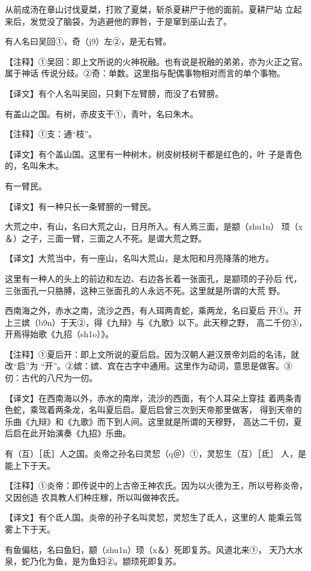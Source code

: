 \documentclass[a4paper,12pt,UTF8,twoside]{ctexbook}
\begin{document}
从前成汤在章山讨伐夏桀，打败了夏桀，斩杀夏耕尸于他的面前。夏耕尸站 立起来后，发觉没了脑袋，为逃避他的罪咎，于是窜到巫山去了。

有人名曰吴回①，奇（j9）左②，是无右臂。

【注释】①吴回：即上文所说的火神祝融。也有说是祝融的弟弟，亦为火正之官。属于神话 传说分歧。②奇：单数。这里指与配偶事物相对而言的单个事物。

【译文】有个人名叫吴回，只剩下左臂膀，而没了右臂膀。

有盖山之国。有树，赤皮支干①，青叶，名曰朱木。

【注释】①支：通“枝”。

【译文】有个盖山国。这里有一种树木，树皮树枝树干都是红色的，叶 子是青色的，名叫朱木。

有一臂民。

【译文】有一种只长一条臂膀的一臂民。

大荒之中，有山，名曰大荒之山，日月所入。有人焉三面，是颛（zhu1n） 顼（x＆）之子，三面一臂，三面之人不死。是谓大荒之野。

【译文】大荒当中，有一座山，名叫大荒山，是太阳和月亮降落的地方。

这里有一种人的头上的前边和左边、右边各长着一张面孔，是颛顼的子孙后 代，三张面孔一只胳膊，这种三张面孔的人永远不死。这里就是所谓的大荒 野。

西南海之外，赤水之南，流沙之西，有人珥两青蛇，乘两龙，名曰夏后 开①。开上三嫔（b9n）于天②，得《九辩》与《九歌》以下。此天穆之野， 高二千仞③，开焉得始歌《九招（sh1o）》。

【注释】①夏后开：即上文所说的夏后启。因为汉朝人避汉景帝刘启的名讳，就改“启”为 “开”。②嫔：嫔、宾在古字中通用。这里作为动词，意思是做客。③仞：古代的八尺为一仞。

【译文】在西南海以外，赤水的南岸，流沙的西面，有个人耳朵上穿挂 着两条青色蛇，乘驾着两条龙，名叫夏后启。夏后启曾三次到天帝那里做客， 得到天帝的乐曲《九辩》和《九歌》而下到人间。这里就是所谓的天穆野， 高达二千仞，夏后启在此开始演奏《九招》乐曲。

有（互）［氐］人之国。炎帝之孙名曰灵恝（q＠）①，灵恝生（互）［氐］ 人，是能上下于天。

【注释】①炎帝：即传说中的上古帝王神农氏。因为以火德为王，所以号称炎帝，又因创造 农具教人们种庄稼，所以叫做神农氏。

【译文】有个氐人国。炎帝的孙子名叫灵恝，灵恝生了氐人，这里的人 能乘云驾雾上下于天。

有鱼偏枯，名曰鱼妇，颛（zhu1n）顼（x＆）死即复苏。风道北来①， 天乃大水泉，蛇乃化为鱼，是为鱼妇②。颛顼死即复苏。
\end{document}

